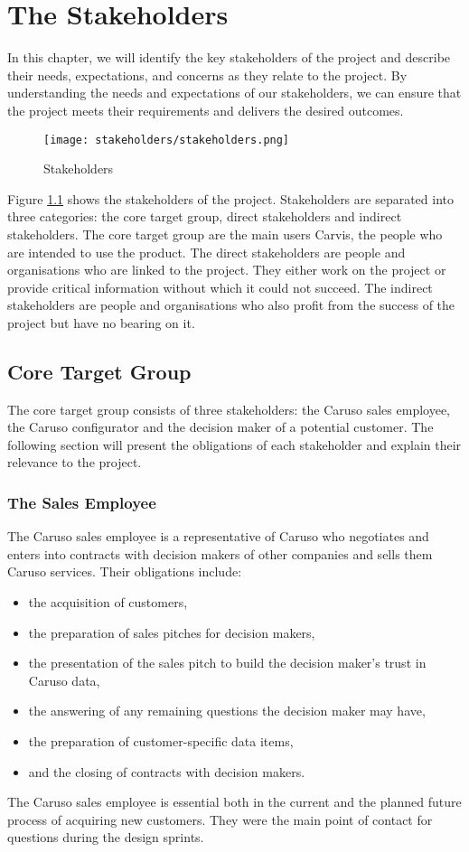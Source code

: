 \chapter{The Stakeholders}
In this chapter, we will identify the key stakeholders of the project and describe their needs, expectations, and concerns as they relate to the project. By understanding the needs and expectations of our stakeholders, we can ensure that the project meets their requirements and delivers the desired outcomes.
\begin{figure}[ht]
  \centering
  \texttt{[image: stakeholders/stakeholders.png]}
  \caption{Stakeholders}
  \label{Kap2:Stakeholders}
\end{figure}
Figure \ref{Kap2:Stakeholders} shows the stakeholders of the project. Stakeholders are separated into three categories: the core target group, direct stakeholders and indirect stakeholders. The core target group are the main users Carvis, the people who are intended to use the product. The direct stakeholders are people and organisations who are linked to the project. They either work on the project or provide critical information without which it could not succeed. The indirect stakeholders are people and organisations who also profit from the success of the project but have no bearing on it.

\section{Core Target Group}
The core target group consists of three stakeholders: the Caruso sales employee, the Caruso configurator and the decision maker of a potential customer. The following section will present the obligations of each stakeholder and explain their relevance to the project.

\subsection{The Sales Employee}
The Caruso sales employee is a representative of Caruso who negotiates and enters into contracts with decision makers of other companies and sells them Caruso services. Their obligations include:
\begin{itemize}
  \item the acquisition of customers,
  \item the preparation of sales pitches for decision makers,
  \item the presentation of the sales pitch to build the decision maker's trust in Caruso data,
  \item the answering of any remaining questions the decision maker may have,
  \item the preparation of customer-specific data items,
  \item and the closing of contracts with decision makers.
\end{itemize}
The Caruso sales employee is essential both in the current and the planned future process of acquiring new customers. They were the main point of contact for questions during the design sprints.

